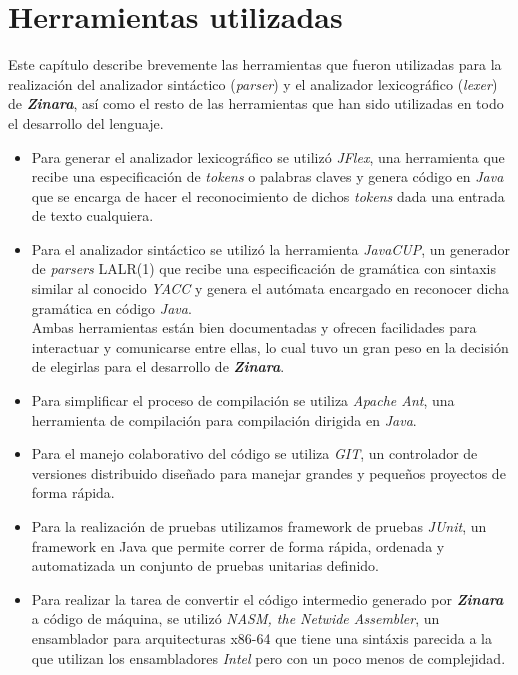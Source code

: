 \documentclass[12pt, spanish]{report}
\begin{document}
\chapter{Herramientas utilizadas}
\label{sec:herramientas}
Este cap\'itulo describe brevemente las herramientas que fueron
utilizadas para la realizaci\'on del analizador sint\'actico
(\emph{parser}) y el analizador lexicogr\'afico (\emph{lexer}) de
\emph{\textbf{Zinara}}, as\'i como el resto de las herramientas que han
sido utilizadas en todo el desarrollo del lenguaje.

\begin{itemize}
\item Para generar el analizador lexicogr\'afico se utiliz\'o
  \emph{JFlex}\cite{jflex}, una herramienta que recibe una
  especificaci\'on de \emph{tokens} o palabras claves y genera c\'odigo en
  \emph{Java} que se encarga de hacer el reconocimiento de dichos
  \emph{tokens} dada una entrada de texto cualquiera.

\item Para el analizador sint\'actico se utiliz\'o la herramienta
  \emph{JavaCUP}\cite{javacup}, un generador de \emph{parsers} LALR(1)
  que recibe una especificaci\'on de gram\'atica con sintaxis similar
  al conocido \emph{YACC} y genera el aut\'omata encargado en
  reconocer dicha gram\'atica en c\'odigo \emph{Java}.\\

  Ambas herramientas est\'an bien documentadas y ofrecen facilidades
  para interactuar y comunicarse entre ellas, lo cual tuvo un gran
  peso en la decisi\'on de elegirlas para el desarrollo de
  \emph{\textbf{Zinara}}.

\item Para simplificar el proceso de compilaci\'on se utiliza
  \emph{Apache Ant}\cite{ant}, una herramienta de compilaci\'on para
  compilaci\'on dirigida en \emph{Java}.

\item Para el manejo colaborativo del c\'odigo se utiliza
  \emph{GIT}\cite{git}, un controlador de versiones distribuido
  dise\~nado para manejar grandes y peque\~nos proyectos de forma
  r\'apida.

\item Para la realizaci\'on de pruebas utilizamos framework de pruebas
  \emph{JUnit}, un framework en Java que permite correr de forma
  r\'apida, ordenada y automatizada un conjunto de pruebas unitarias
  definido.

\item Para realizar la tarea de convertir el código intermedio
  generado por \emph{\textbf{Zinara}} a código de máquina, se utilizó
  \emph{NASM, the Netwide Assembler}, un ensamblador para
  arquitecturas x86-64 que tiene una sintáxis parecida a la que
  utilizan los ensambladores \emph{Intel} pero con un poco menos de
  complejidad.
\end{itemize}
\end{document}

